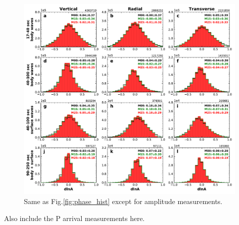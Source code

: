 \documentclass[extra,mreferee]{gji}
\begin{document}
\begin{figure}
  \centering
  \includegraphics[width=\textwidth]{figures/dlna_histogram.pdf}
  \caption{Same as Fig.\ref{fig:phase_hist} except for amplitude measurements.}
\end{figure}

Also include the P arrival measurements here.
\end{document}
